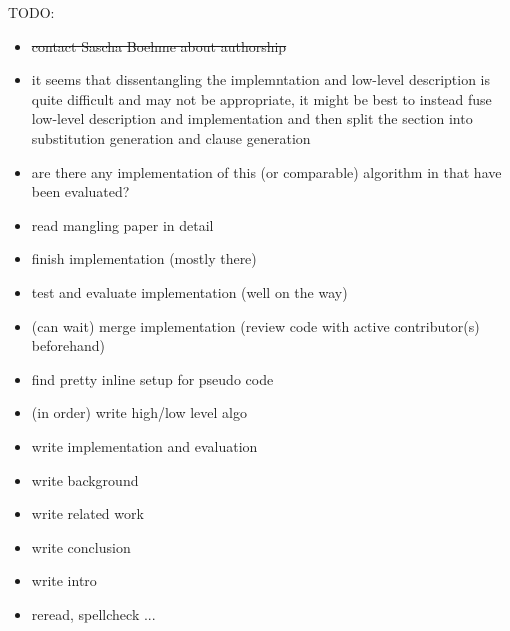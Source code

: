 \documentclass{article}
\begin{document}
TODO:
   \begin{itemize}
      \item \st{contact Sascha Boehme about authorship}

      \item it seems that dissentangling the implemntation and low-level description is quite difficult and may not be appropriate, it might be best to instead fuse low-level description and implementation and then split the section into substitution generation and clause generation
      
      \item are there any implementation of this (or comparable) algorithm in that have been evaluated?
      \item read mangling paper in detail
      \item finish implementation (mostly there)
      \item test and evaluate implementation (well on the way)
      \item (can wait) merge implementation (review code with active contributor(s) beforehand)
      \item find pretty inline setup for pseudo code
      \item (in order) write high/low level algo
      \item write implementation and evaluation
      \item write background
      \item write related work
      \item write conclusion
      \item write intro
      \item reread, spellcheck ...
    \end{itemize}

\end{document}

